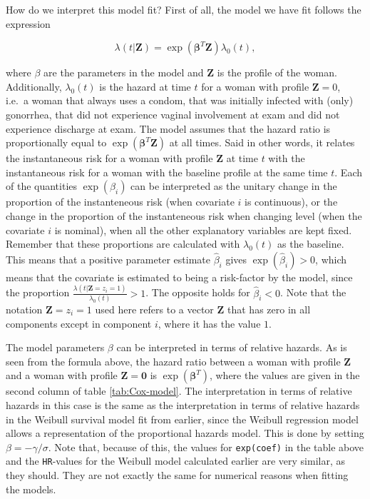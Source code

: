 \documentclass[
]{article}
\begin{document}
How do we interpret this model fit? First of all, the model we have fit follows the expression

\[
\lambda(t|\mathbf{Z}) =  \exp(\mathbf{\beta}^T\mathbf{Z})\lambda_0(t),  
\]

where \(\beta\) are the parameters in the model and \(\mathbf{Z}\) is the profile of the woman. Additionally, \(\lambda_0(t)\) is the hazard at time \(t\) for a woman with profile \(\mathbf{Z} = 0\), i.e.~a woman that always uses a condom, that was initially infected with (only) gonorrhea, that did not experience vaginal involvement at exam and did not experience discharge at exam. The model assumes that the hazard ratio is proportionally equal to \(\exp(\mathbf{\beta}^T\mathbf{Z})\) at all times. Said in other words, it relates the instantaneous risk for a woman with profile \(\mathbf{Z}\) at time \(t\) with the instantaneous risk for a woman with the baseline profile at the same time \(t\). Each of the quantities \(\exp(\beta_i)\) can be interpreted as the unitary change in the proportion of the instanteneous risk (when covariate \(i\) is continuous), or the change in the proportion of the instanteneous risk when changing level (when the covariate \(i\) is nominal), when all the other explanatory variables are kept fixed. Remember that these proportions are calculated with \(\lambda_0(t)\) as the baseline. This means that a positive parameter estimate \(\hat{\beta}_i\) gives \(\exp(\hat{\beta}_i) > 0\), which means that the covariate is estimated to being a risk-factor by the model, since the proportion \(\frac{\lambda(t|\mathbf{Z} = z_i = 1)}{\lambda_0(t)} > 1\). The opposite holds for \(\hat{\beta}_i < 0\). Note that the notation \(\mathbf{Z} = z_i = 1\) used here refers to a vector \(\mathbf{Z}\) that has zero in all components except in component \(i\), where it has the value \(1\).

The model parameters \(\beta\) can be interpreted in terms of relative hazards. As is seen from the formula above, the hazard ratio between a woman with profile \(\mathbf{Z}\) and a woman with profile \(\mathbf{Z} = \mathbf{0}\) is \(\exp(\mathbf{\beta}^T)\), where the values are given in the second column of table \ref{tab:Cox-model}. The interpretation in terms of relative hazards in this case is the same as the interpretation in terms of relative hazards in the Weibull survival model fit from earlier, since the Weibull regression model allows a representation of the proportional hazards model. This is done by setting \(\beta = -\gamma/\sigma\). Note that, because of this, the values for \texttt{exp(coef)} in the table above and the \texttt{HR}-values for the Weibull model calculated earlier are very similar, as they should. They are not exactly the same for numerical reasons when fitting the models.
\end{document}
